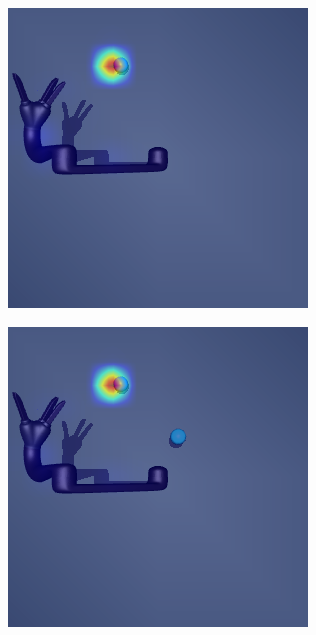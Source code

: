 \begin{figure}[h!]
  \begin{subfigure}{0.24\columnwidth}
    \includegraphics[width=\linewidth]{figures/chapter6/distractor_saliency_jaco_pro_off/standard_visual_random}
  \end{subfigure}
  \begin{subfigure}{0.24\columnwidth}
    \includegraphics[width=\linewidth]{figures/chapter6/distractor_saliency_jaco_pro_off/color_visual_random}

\end{subfigure}
\end{figure}
